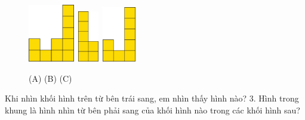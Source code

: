 \begin{multicols}{2}
\begin{thBox}
		\end{thBox}
	\begin{figure}[H]
		\centering
		\captionsetup{labelformat= empty, justification=centering}
		\includegraphics[width=0.18\textwidth]{7a}\,
		\includegraphics[width=0.08\textwidth]{7b}\,
		\includegraphics[width=0.13\textwidth]{7c}
		\caption{{\color[named]{toancuabi}\hspace*{5pt}(A)\hspace*{50pt} (B) \hspace*{35pt}(C)}}
		\vspace*{-5pt}
	\end{figure} 
	\end{multicols}
	Khi nhìn khối hình trên từ {\color[named]{toancuabi}bên trái} sang, em nhìn thấy hình nào?
	\vskip 0.1cm
	$3.$ Hình trong khung là hình nhìn từ {\color[named]{toancuabi}bên phải} sang của khối hình nào trong các khối hình sau?
	\vskip 0.1cm
